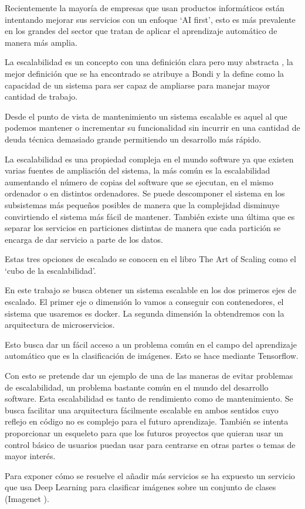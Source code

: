 Recientemente la mayoría de empresas que usan productos informáticos están intentando mejorar sus servicios con un enfoque `AI first', esto es más prevalente en los grandes del sector que  tratan de aplicar el aprendizaje automático de manera más amplia.

La escalabilidad es un concepto con una definición clara pero muy abstracta \cite{hill90}, la mejor definición que se ha encontrado se atribuye a Bondi \cite{bondi00} y la define como la capacidad de un sistema para ser capaz de ampliarse para manejar mayor cantidad de trabajo. 

Desde el punto de vista de mantenimiento un sistema escalable es aquel al que podemos mantener o incrementar su funcionalidad sin incurrir en una cantidad de deuda técnica demasiado grande permitiendo un desarrollo más rápido.

La escalabilidad es una propiedad compleja en el mundo software ya que existen varias fuentes de ampliación del sistema, la más común es la escalabilidad aumentando el número de copias del software que se ejecutan, en el mismo ordenador o en distintos ordenadores. Se puede descomponer el sistema en los subsistemas más pequeños posibles de manera que la complejidad disminuye convirtiendo el sistema más fácil de mantener. También existe una última que es separar los servicios en particiones distintas de manera que cada partición se encarga de dar servicio a parte de los datos.

Estas tres opciones de escalado se conocen en el libro The Art of Scaling \cite{scala09} como el `cubo de la escalabilidad'. 

En este trabajo se busca obtener un sistema escalable en los dos primeros ejes de escalado. El primer eje o dimensión lo vamos a conseguir con contenedores, el sistema que usaremos es docker. La segunda dimensión la obtendremos con la arquitectura de microservicios. 

Esto busca dar un fácil acceso a un problema común en el campo del aprendizaje automático que es la clasificación de imágenes. Esto se hace mediante Tensorflow.

Con esto se pretende dar un ejemplo de una de las  maneras de evitar problemas de escalabilidad, un problema bastante común en el mundo del desarrollo software. Esta escalabilidad es tanto de rendimiento como de mantenimiento. Se busca facilitar una arquitectura fácilmente escalable en ambos sentidos cuyo reflejo en código no es complejo para el futuro aprendizaje. También se intenta proporcionar un esqueleto para que los futuros proyectos que quieran usar un control básico de usuarios puedan usar para centrarse en otras partes o temas de mayor interés.

Para exponer cómo se resuelve el añadir más servicios se ha expuesto un servicio que usa Deep Learning para clasificar imágenes sobre un conjunto de clases (Imagenet \cite{imnet}).